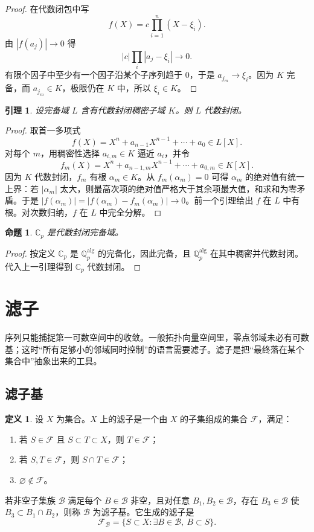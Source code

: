 \documentclass[11pt,a4paper,openany]{ctexbook}
\numberwithin{equation}{chapter}
\newcommand{\Q}{\mathbb{Q}}
\newcommand{\C}{\mathbb{C}}
\theoremstyle{plain}
\newtheorem{proposition}[theorem]{命题}
\newtheorem{lemma}[theorem]{引理}
\theoremstyle{definition}
\newtheorem{definition}[theorem]{定义}
\theoremstyle{remark}
\begin{document}
\begin{proof}
在代数闭包中写
\[
  f(X)=c\prod_{i=1}^n (X-\xi_i).
\]
由 $|f(a_j)|\to0$ 得
\[
  |c|\prod_i |a_j-\xi_i|\to0.
\]
有限个因子中至少有一个因子沿某个子序列趋于 $0$，于是 $a_{j_m}\to \xi_i$。因为 $K$ 完备，而 $a_{j_m}\in K$，极限仍在 $K$ 中，所以 $\xi_i\in K$。
\end{proof}

\begin{lemma}
设完备域 $L$ 含有代数封闭稠密子域 $K$。则 $L$ 代数封闭。
\end{lemma}

\begin{proof}
取首一多项式
\[
  f(X)=X^n+a_{n-1}X^{n-1}+\cdots+a_0\in L[X].
\]
对每个 $m$，用稠密性选择 $a_{i,m}\in K$ 逼近 $a_i$，并令
\[
  f_m(X)=X^n+a_{n-1,m}X^{n-1}+\cdots+a_{0,m}\in K[X].
\]
因为 $K$ 代数封闭，$f_m$ 有根 $\alpha_m\in K$。从 $f_m(\alpha_m)=0$ 可得 $\alpha_m$ 的绝对值有统一上界：若 $|\alpha_m|$ 太大，则最高次项的绝对值严格大于其余项最大值，和求和为零矛盾。于是 $|f(\alpha_m)|=|f(\alpha_m)-f_m(\alpha_m)|\to0$。前一个引理给出 $f$ 在 $L$ 中有根。对次数归纳，$f$ 在 $L$ 中完全分解。
\end{proof}

\begin{proposition}
$\C_p$ 是代数封闭完备域。
\end{proposition}

\begin{proof}
按定义 $\C_p$ 是 $\Q_p^{\mathrm{alg}}$ 的完备化，因此完备，且 $\Q_p^{\mathrm{alg}}$ 在其中稠密并代数封闭。代入上一引理得到 $\C_p$ 代数封闭。
\end{proof}

\section{滤子}

序列只能捕捉第一可数空间中的收敛。一般拓扑向量空间里，零点邻域未必有可数基；这时“所有足够小的邻域同时控制”的语言需要滤子。滤子是把“最终落在某个集合中”抽象出来的工具。

\subsection{滤子基}

\begin{definition}
设 $X$ 为集合。$X$ 上的滤子是一个由 $X$ 的子集组成的集合 $\mathcal F$，满足：
\begin{enumerate}[label=(\arabic*)]
\item 若 $S\in\mathcal F$ 且 $S\subset T\subset X$，则 $T\in\mathcal F$；
\item 若 $S,T\in\mathcal F$，则 $S\cap T\in\mathcal F$；
\item $\varnothing\notin\mathcal F$。
\end{enumerate}
若非空子集族 $\mathcal B$ 满足每个 $B\in\mathcal B$ 非空，且对任意 $B_1,B_2\in\mathcal B$，存在 $B_3\in\mathcal B$ 使 $B_3\subset B_1\cap B_2$，则称 $\mathcal B$ 为滤子基。它生成的滤子是
\[
  \mathcal F_{\mathcal B}=\{S\subset X:\exists B\in\mathcal B,\ B\subset S\}.
\]
\end{definition}
\end{document}
